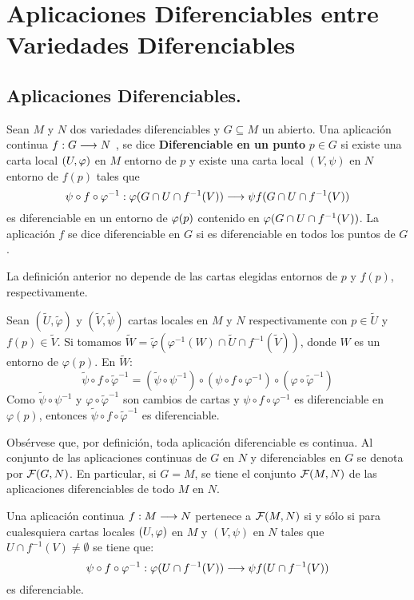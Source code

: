 \documentclass[cursovd_portada.tex]{subfiles}
\begin{document}
\chapter{Aplicaciones Diferenciables entre Variedades Diferenciables}
\section{Aplicaciones Diferenciables.}
\begin{defi}
Sean $M$ y $N$ dos variedades diferenciables y $G\subseteq M$ un abierto. Una aplicación continua $f:G\longrightarrow N$ , se
dice {\bf Diferenciable en un punto} $p\in G$ si existe una carta local $(U,\varphi)$ en $M$ entorno de $p$ y existe
una carta local $(V,\psi)$ en $N$ entorno de $f(p)$ tales que
$$\psi\circ f\circ\varphi^{-1}:\varphi(G\cap U\cap f^{-1}(V))\longrightarrow\psi f(G\cap U\cap f^{-1}(V))$$
es diferenciable en un entorno de $\varphi(p)$ contenido en $\varphi(G\cap U\cap f^{-1}(V))$. La aplicación $f$ se dice
diferenciable en $G$ si es diferenciable en todos los puntos de $G$.
\end{defi}
\begin{prop}
La definición anterior no depende de las cartas elegidas entornos de $p$ y $f(p)$, respectivamente.
\end{prop}
\begin{dem}
Sean $(\tilde{U},\tilde{φ})$ y $(\tilde{V},\tilde{ψ})$ cartas locales en $M$ y $N$ respectivamente con $p \in \tilde{U}$ y $f(p) \in \tilde{V}$. Si tomamos $\tilde{W} = \tilde{φ}(φ^{-1}(W) \cap \tilde{U} \cap f^{-1}(\tilde{V}))$, donde $W$ es un entorno de $φ(p)$. En $\tilde{W}$:
\[ \tilde{ψ} \circ f \circ \tilde{φ}^{-1} = (\tilde{ψ}\circ ψ^{-1}) \circ (ψ \circ f \circ φ^{-1}) \circ (φ \circ \tilde{φ}^{-1}) \]
Como $\tilde{ψ} \circ ψ^{-1}$ y $φ \circ \tilde{φ}^{-1}$ son cambios de cartas y $ψ \circ f \circ φ^{-1}$ es diferenciable en $φ(p)$, entonces $\tilde{ψ} \circ f \circ \tilde{φ}^{-1}$ es diferenciable. \QED
\end{dem}
Obsérvese que, por definición, toda aplicación
diferenciable es continua. Al conjunto de las aplicaciones
continuas de $G$ en $N$ y diferenciables en $G$ se denota por
${\cal F}(G,N)$. En particular, si $G=M$, se tiene el conjunto
${\cal F}(M,N)$ de las aplicaciones diferenciables de todo $M$ en
$N$.
\begin{prop}
Una aplicación continua $f:M\longrightarrow N$ pertenece a ${\cal F}(M,N)$ si y sólo si para cualesquiera cartas locales
$(U,\varphi)$ en $M$ y $(V,\psi)$ en $N$ tales que $U\cap f^{-1}(V)\neq\emptyset$ se tiene que:
$$\psi\circ f\circ\varphi^{-1}:\varphi(U\cap f^{-1}(V))\longrightarrow\psi f(U\cap f^{-1}(V))$$
es diferenciable.
\end{prop}
\end{document}
